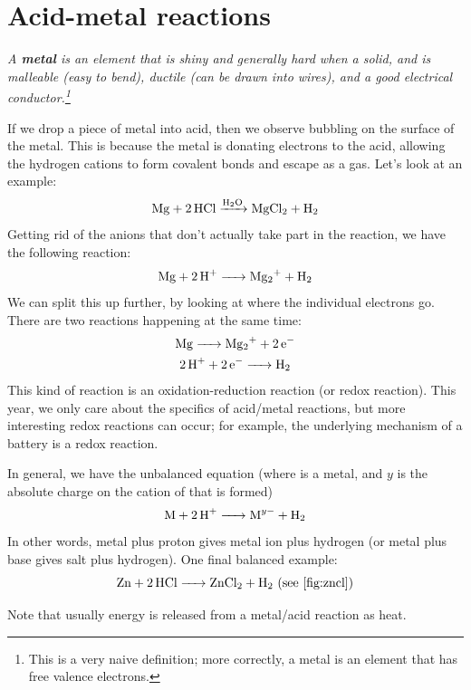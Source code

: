 \documentclass[a4paper]{memoir}
\begin{document}
\section{Acid-metal reactions}

{\itshape
  A \textbf{metal} is an element that is shiny and generally hard when a solid, and is malleable (easy to bend), ductile (can be drawn into wires),
  and a good electrical conductor.\footnote{This is a very naive definition; more correctly, a metal is an element that has free valence electrons.}
}

If we drop a piece of metal into acid, then we observe bubbling on the surface of the metal. This is because the metal is donating electrons to the
acid, allowing the hydrogen cations to form covalent bonds and escape as a gas. Let's look at an example:
\begin{displaymath}
  \ce{Mg + 2HCl ->[H2O] MgCl2 + H2}
\end{displaymath}
Getting rid of the  anions that don't actually take part in the reaction, we have the following reaction:
\begin{equation}
  \ce{Mg + 2H+ -> Mg2+ + H2}
\end{equation}
We can split this up further, by looking at where the individual electrons go. There are two reactions happening at the same time:
\begin{gather}
  \ce{Mg -> Mg2+ + 2e-}\\
  \ce{2H+ + 2e- -> H2}
\end{gather}
This kind of reaction is an oxidation-reduction reaction (or redox reaction). This year, we only care about the specifics of acid/metal
reactions, but more interesting redox reactions can occur; for example, the underlying mechanism of a battery is a redox reaction.

In general, we have the unbalanced equation (where  is a metal, and $ y $ is the absolute charge on the cation of  that is formed)
\begin{equation}
  \ce{M + 2H+ -> M^y- + H2}
\end{equation}
In other words, metal plus proton gives metal ion plus hydrogen (or metal plus base gives salt plus hydrogen). One final balanced example:
\begin{equation}
  \ce{Zn + 2HCl -> ZnCl2 + H2} \text{ (see \cref{fig:zncl})}
\end{equation}

Note that usually energy is released from a metal/acid reaction as heat.
\end{document}
